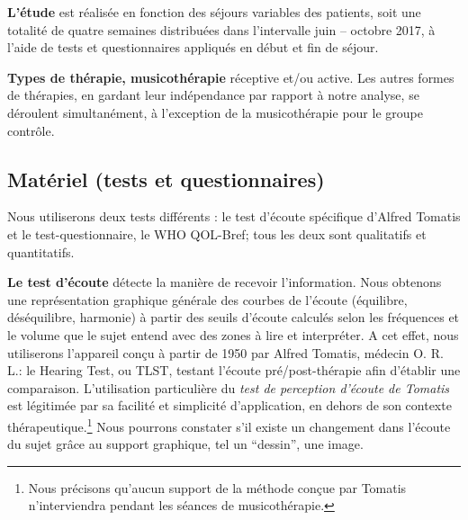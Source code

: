 \textbf{L'étude} est
réalisée en fonction des séjours variables des patients, soit une
totalité  de quatre semaines
distribuées dans l'intervalle juin --
octobre 2017,  à l'aide de tests et questionnaires appliqués en début
et fin de séjour.

\textbf{Types de thérapie, musicothérapie} réceptive et/ou active.
Les autres formes de thérapies, en gardant
leur indépendance par rapport à notre analyse, se déroulent simultanément, à
l'exception de la musicothérapie pour le groupe contrôle.


\subsection{Matériel (tests et questionnaires)}
	Nous utiliserons deux tests différents : 
	le test d'écoute spécifique d'Alfred Tomatis
	et le test-questionnaire, le WHO QOL-Bref; tous les deux sont
        qualitatifs et quantitatifs.

        
        \textbf{Le test d'écoute} détecte la manière de recevoir
        l'information. 
Nous obtenons une  
	représentation graphique générale des courbes de l'écoute
        (équilibre, déséquilibre, harmonie) à partir des seuils d'écoute
        calculés selon les fréquences et le volume que le sujet entend
        avec des zones à lire et interpréter.
	A cet effet, nous utiliserons l'appareil conçu à partir de 1950 par Alfred Tomatis, médecin
        O. R. L.: le Hearing Test, ou TLST, testant
        l'écoute pré/post-thérapie
        afin d'établir une comparaison.
        L'utilisation particulière du \textit{test de perception d'écoute de Tomatis}  est
légitimée par sa facilité et  simplicité d'application, en dehors de
son contexte thérapeutique.\footnote{Nous précisons qu'aucun support de la méthode conçue par
        Tomatis n'interviendra pendant les séances de musicothérapie.}
      Nous pourrons constater
      s'il existe un changement dans l'écoute du sujet grâce au support graphique, tel un ``dessin'',
      une image. %
      
